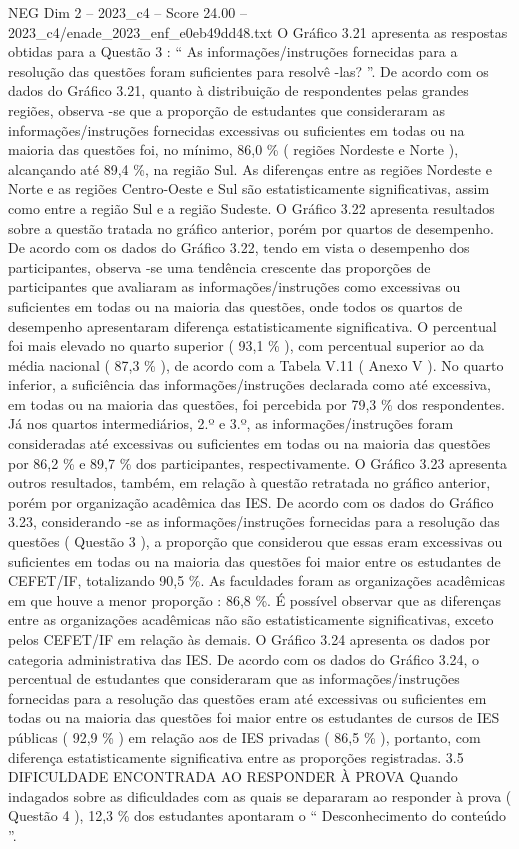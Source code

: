 \begin{textsample}{NEG Dim 2 – 2023\_c4 – Score 24.00 – 2023\_c4/enade\_2023\_enf\_e0eb49dd48.txt}
O Gráfico 3.21 apresenta as respostas obtidas para a Questão 3 : “ As informações/instruções fornecidas para a resolução das questões foram suficientes para resolvê -las? ”.
De acordo com os dados do Gráfico 3.21, quanto à distribuição de respondentes pelas grandes regiões, observa -se que a proporção de estudantes que consideraram as informações/instruções fornecidas excessivas ou suficientes em todas ou na maioria das questões foi, no mínimo, 86,0 \% ( regiões Nordeste e Norte ), alcançando até 89,4 \%, na região Sul.
As diferenças entre as regiões Nordeste e Norte e as regiões Centro-Oeste e Sul são estatisticamente significativas, assim como entre a região Sul e a região Sudeste.
O Gráfico 3.22 apresenta resultados sobre a questão tratada no gráfico anterior, porém por quartos de desempenho.
De acordo com os dados do Gráfico 3.22, tendo em vista o desempenho dos participantes, observa -se uma tendência crescente das proporções de participantes que avaliaram as informações/instruções como excessivas ou suficientes em todas ou na maioria das questões, onde todos os quartos de desempenho apresentaram diferença estatisticamente significativa.
O percentual foi mais elevado no quarto superior ( 93,1 \% ), com percentual superior ao da média nacional ( 87,3 \% ), de acordo com a Tabela V.11 ( Anexo V ).
No quarto inferior, a suficiência das informações/instruções declarada como até excessiva, em todas ou na maioria das questões, foi percebida por 79,3 \% dos respondentes.
Já nos quartos intermediários, 2.º e 3.º, as informações/instruções foram consideradas até excessivas ou suficientes em todas ou na maioria das questões por 86,2 \% e 89,7 \% dos participantes, respectivamente.
O Gráfico 3.23 apresenta outros resultados, também, em relação à questão retratada no gráfico anterior, porém por organização acadêmica das IES.
De acordo com os dados do Gráfico 3.23, considerando -se as informações/instruções fornecidas para a resolução das questões ( Questão 3 ), a proporção que considerou que essas eram excessivas ou suficientes em todas ou na maioria das questões foi maior entre os estudantes de CEFET/IF, totalizando 90,5 \%.
As faculdades foram as organizações acadêmicas em que houve a menor proporção : 86,8 \%.
É possível observar que as diferenças entre as organizações acadêmicas não são estatisticamente significativas, exceto pelos CEFET/IF em relação às demais.
O Gráfico 3.24 apresenta os dados por categoria administrativa das IES.
De acordo com os dados do Gráfico 3.24, o percentual de estudantes que consideraram que as informações/instruções fornecidas para a resolução das questões eram até excessivas ou suficientes em todas ou na maioria das questões foi maior entre os estudantes de cursos de IES públicas ( 92,9 \% ) em relação aos de IES privadas ( 86,5 \% ), portanto, com diferença estatisticamente significativa entre as proporções registradas. 3.5 DIFICULDADE ENCONTRADA AO RESPONDER À PROVA Quando indagados sobre as dificuldades com as quais se depararam ao responder à prova ( Questão 4 ), 12,3 \% dos estudantes apontaram o “ Desconhecimento do conteúdo ”.

\end{textsample}
